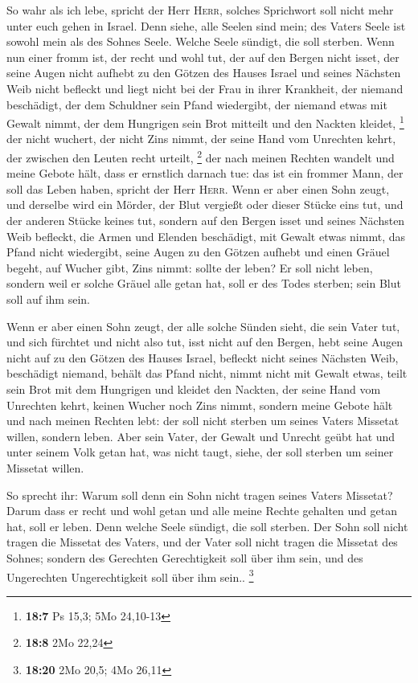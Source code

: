  So wahr als ich lebe, spricht der Herr \textsc{Herr},
solches Sprichwort soll nicht mehr unter euch gehen in Israel.
 Denn siehe, alle Seelen sind mein; des Vaters Seele ist
sowohl mein als des Sohnes Seele. Welche Seele sündigt, die soll
sterben.  Wenn nun einer fromm ist, der recht und wohl
tut,  der auf den Bergen nicht isset, der seine Augen
nicht aufhebt zu den Götzen des Hauses Israel und seines Nächsten Weib
nicht befleckt und liegt nicht bei der Frau in ihrer Krankheit,
 der niemand beschädigt, der dem Schuldner sein Pfand
wiedergibt, der niemand etwas mit Gewalt nimmt, der dem Hungrigen sein
Brot mitteilt und den Nackten kleidet, \footnote{\textbf{18:7} Ps 15,3;
  5Mo 24,10-13}  der nicht wuchert, der nicht Zins nimmt,
der seine Hand vom Unrechten kehrt, der zwischen den Leuten recht
urteilt, \footnote{\textbf{18:8} 2Mo 22,24}  der nach
meinen Rechten wandelt und meine Gebote hält, dass er ernstlich darnach
tue: das ist ein frommer Mann, der soll das Leben haben, spricht der
Herr \textsc{Herr}.  Wenn er aber einen Sohn zeugt, und
derselbe wird ein Mörder, der Blut vergießt oder dieser Stücke eins tut,
 und der anderen Stücke keines tut, sondern auf den
Bergen isset und seines Nächsten Weib befleckt,  die
Armen und Elenden beschädigt, mit Gewalt etwas nimmt, das Pfand nicht
wiedergibt, seine Augen zu den Götzen aufhebt und einen Gräuel begeht,
 auf Wucher gibt, Zins nimmt: sollte der leben? Er soll
nicht leben, sondern weil er solche Gräuel alle getan hat, soll er des
Todes sterben; sein Blut soll auf ihm sein.

 Wenn er aber einen Sohn zeugt, der alle solche Sünden
sieht, die sein Vater tut, und sich fürchtet und nicht also tut,
 isst nicht auf den Bergen, hebt seine Augen nicht auf zu
den Götzen des Hauses Israel, befleckt nicht seines Nächsten Weib,
 beschädigt niemand, behält das Pfand nicht, nimmt nicht
mit Gewalt etwas, teilt sein Brot mit dem Hungrigen und kleidet den
Nackten,  der seine Hand vom Unrechten kehrt, keinen
Wucher noch Zins nimmt, sondern meine Gebote hält und nach meinen
Rechten lebt: der soll nicht sterben um seines Vaters Missetat willen,
sondern leben.  Aber sein Vater, der Gewalt und Unrecht
geübt hat und unter seinem Volk getan hat, was nicht taugt, siehe, der
soll sterben um seiner Missetat willen.

 So sprecht ihr: Warum soll denn ein Sohn nicht tragen
seines Vaters Missetat? Darum dass er recht und wohl getan und alle
meine Rechte gehalten und getan hat, soll er leben.  Denn
welche Seele sündigt, die soll sterben. Der Sohn soll nicht tragen die
Missetat des Vaters, und der Vater soll nicht tragen die Missetat des
Sohnes; sondern des Gerechten Gerechtigkeit soll über ihm sein, und des
Ungerechten Ungerechtigkeit soll über ihm sein.. \footnote{\textbf{18:20}
  2Mo 20,5; 4Mo 26,11}

